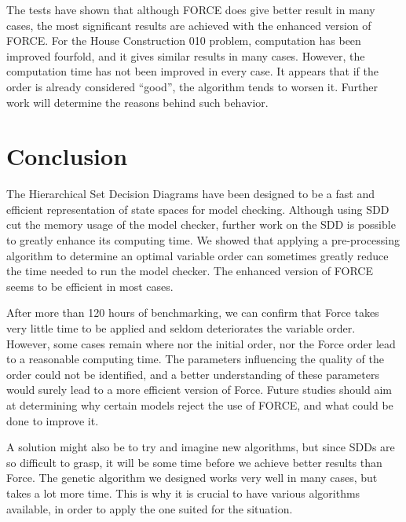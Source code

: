 \documentclass[12pt]{report}
\begin{document}
The tests have shown that although FORCE does give better result in many cases, the most significant results are achieved with the enhanced version of FORCE. For the House Construction 010 problem, computation has been improved fourfold, and it gives similar results in many cases. However, the computation time has not been improved in every case. It appears that if the order is already considered \enquote{good}, the algorithm tends to worsen it. Further work will determine the reasons behind such behavior.

\newpage
\section*{Conclusion}

The Hierarchical Set Decision Diagrams have been designed to be a fast and efficient representation of state spaces for model checking. Although using SDD cut the memory usage of the model checker, further work on the SDD is possible to greatly enhance its computing time. We showed that applying a pre-processing algorithm to determine an optimal variable order can sometimes greatly reduce the time needed to run the model checker. The enhanced version of FORCE seems to be efficient in most cases.

After more than 120 hours of benchmarking, we can confirm that Force takes very little time to be applied and seldom deteriorates the variable order. However, some cases remain where nor the initial order, nor the Force order lead to a reasonable computing time. The parameters influencing the quality of the order could not be identified, and a better understanding of these parameters would surely lead to a more efficient version of Force. Future studies should aim at determining why certain models reject the use of FORCE, and what could be done to improve it.

A solution might also be to try and imagine new algorithms, but since SDDs are so difficult to grasp, it will be some time before we achieve better results than Force. The genetic algorithm we designed works very well in many cases, but takes a lot more time. This is why it is crucial to have various algorithms available, in order to apply the one suited for the situation.

\printbibliography
\end{document}
